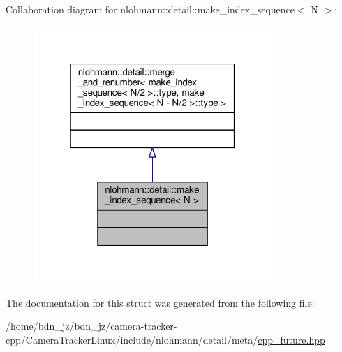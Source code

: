 Collaboration diagram for nlohmann\+:\+:detail\+:\+:make\+\_\+index\+\_\+sequence$<$ N $>$\+:\nopagebreak
\begin{figure}[H]
\begin{center}
\leavevmode
\includegraphics[width=256pt]{structnlohmann_1_1detail_1_1make__index__sequence__coll__graph}
\end{center}
\end{figure}


The documentation for this struct was generated from the following file\+:\begin{DoxyCompactItemize}
\item 
/home/bdn\+\_\+jz/bdn\+\_\+jz/camera-\/tracker-\/cpp/\+Camera\+Tracker\+Linux/include/nlohmann/detail/meta/\hyperlink{cpp__future_8hpp}{cpp\+\_\+future.\+hpp}\end{DoxyCompactItemize}
